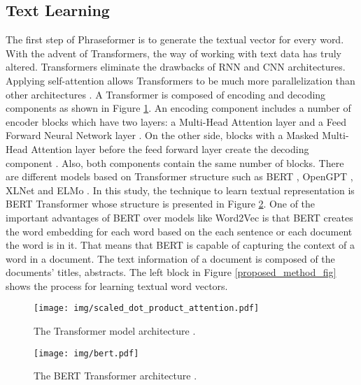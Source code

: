 \documentclass[review,3p]{elsarticle}
\begin{document}
\subsection{Text Learning} \label{III-B}
The first step of Phraseformer is to generate the textual vector for every word. With the advent of Transformers, the way of working with text data has truly altered. Transformers eliminate the drawbacks of RNN and CNN architectures. Applying self-attention allows Transformers to be much more parallelization than other architectures \cite{minaee2020deep}. A  Transformer is composed of encoding and decoding components  as shown in Figure \ref{fig:transformer}. An encoding component includes a number of encoder blocks which have two layers: a Multi-Head Attention layer and a Feed Forward Neural Network layer \cite{asgari2020topicbert}. On the other side,  blocks with a Masked Multi-Head Attention layer before the feed forward layer create the decoding component \cite{vaswani2017attention}. Also, both components contain the same number of blocks. There are different models based on Transformer structure such as BERT \cite{devlin2018bert}, OpenGPT \cite{radford2018improving,radford2019language}, XLNet \cite{yang2019xlnet} and ELMo \cite{peters2018deep}. In this study, the technique to learn textual representation is BERT Transformer whose structure is presented in Figure \ref{fig:bert}. One of the important advantages of BERT over models like Word2Vec is that BERT creates the word embedding for each word based on the each sentence or each document the word is in it. That means that BERT is capable of capturing the context of a word in a document. The text information of a document is composed of the documents’ titles,
abstracts. The left block in Figure \ref{proposed_method_fig} shows the process for learning textual word vectors.


\begin{figure}[ht]
    \centering
    \texttt{[image: img/scaled\_dot\_product\_attention.pdf]}
    \caption{ The Transformer model architecture \cite{asgari2020multimodal}.}
    \label{fig:transformer}
\end{figure}

\begin{figure}[ht]
    \centering
    \texttt{[image: img/bert.pdf]}
    \caption{The BERT Transformer architecture \cite{nikzad2020berters}.}
    \label{fig:bert}
\end{figure}
\end{document}
